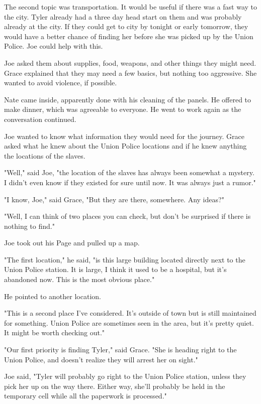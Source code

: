 \documentclass[courier]{sffms}
\begin{document}
The second topic was transportation. It would be
useful if there was a fast way to the city. Tyler already
had a three day head start on them and was probably
already at the city. If they could get to city by tonight
or early tomorrow, they would have a better chance
of finding her before she was picked up by the Union
Police. Joe could help with this.

Joe asked them about supplies, food, weapons, and
other things they might need. Grace explained that
they may need a few basics, but nothing too aggressive.
She wanted to avoid violence, if possible.

Nate came inside, apparently done with his cleaning
of the panels. He offered to make dinner, which was
agreeable to everyone. He went to work again as the
conversation continued.

Joe wanted to know what information they would need
for the journey. Grace asked what he knew about the
Union Police locations and if he knew anything the
locations of the slaves.

"Well," said Joe, "the location of the slaves has always been 
somewhat a mystery. I didn't even know if they
existed for sure until now. It was always just a
rumor."

"I know, Joe," said Grace, "But they are there, somewhere.
Any ideas?"

"Well, I can think of two places you can check, but don't
be surprised if there is nothing to find."

Joe took out his Page and pulled up a map.

"The first location," he said, "is this large building located
directly next to the Union Police station. It is large, I think
it used to be a hospital, but it's abandoned now. This is 
the most obvious place."

He pointed to another location.

"This is a second place I've considered. It's outside of
town but is still maintained for something. Union Police
are sometimes seen in the area, but it's pretty quiet.
It might be worth checking out."

"Our first priority is finding Tyler," said Grace.
"She is heading right
to the Union Police, and doesn't realize they will arrest
her on sight."

Joe said, "Tyler will probably go right to the Union
Police station, unless they pick her up on the way
there. Either way, she'll probably be held in the
temporary cell while all the paperwork is processed."
\end{document}
